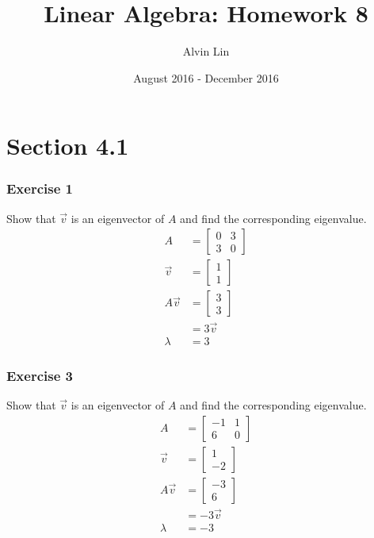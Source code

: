 \documentclass{math}
\title{Linear Algebra: Homework 8}
\author{Alvin Lin}
\date{August 2016 - December 2016}
\begin{document}
\maketitle

\section*{Section 4.1}

\subsubsection*{Exercise 1}
Show that \( \vec{v} \) is an eigenvector of \( A \) and find the corresponding
eigenvalue.
\begin{align*}
  A &= \begin{bmatrix}0 & 3 \\ 3 & 0\end{bmatrix} \\
  \vec{v} &= \begin{bmatrix}1 \\ 1\end{bmatrix} \\
  A\vec{v} &= \begin{bmatrix}3 \\ 3\end{bmatrix} \\
  &= 3\vec{v} \\
  \lambda &= 3
\end{align*}

\subsubsection*{Exercise 3}
Show that \( \vec{v} \) is an eigenvector of \( A \) and find the corresponding
eigenvalue.
\begin{align*}
  A &= \begin{bmatrix}-1 & 1 \\ 6 & 0\end{bmatrix} \\
  \vec{v} &= \begin{bmatrix}1 \\ -2\end{bmatrix} \\
  A\vec{v} &= \begin{bmatrix}-3 \\ 6\end{bmatrix} \\
  &= -3\vec{v} \\
  \lambda &= -3
\end{align*}
\end{document}
